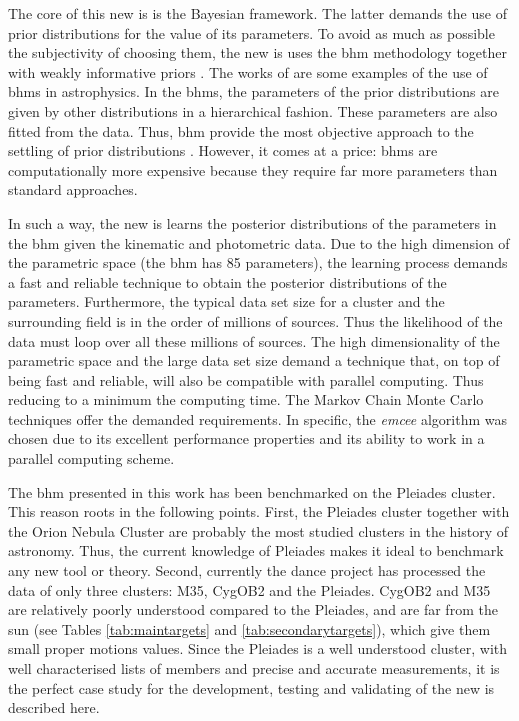 The core of this new \gls{is} is the Bayesian framework. The latter demands the use of prior distributions for the value of its parameters. To avoid as much as possible the subjectivity of choosing them, the new \gls{is} uses the \gls{bhm} methodology together with weakly informative priors  \cite[see]{Gelman2006,Gelman2008,Huang2013,Chung2015}. The works of \citet{Jefferys2007,Shkedy2007,Hogg2010,Sale2012, Feeney2013} are some examples of the use of \glspl{bhm} in astrophysics. In the \glspl{bhm}, the parameters of the prior distributions are given by other distributions in a hierarchical fashion. These parameters are also fitted from the data. Thus, \gls{bhm} provide the most objective approach to the settling of prior distributions \citep{Gelman2006}. However, it comes at a price: \glspl{bhm} are computationally more expensive because they require far more parameters than standard approaches. 

In such a way, the new \gls{is} learns the posterior distributions of the parameters in the \gls{bhm} given the kinematic and photometric data. Due to the high dimension of the parametric space (the \gls{bhm} has 85 parameters), the learning process demands a fast and reliable technique to obtain the posterior distributions of the parameters. Furthermore, the typical data set size for a cluster and the surrounding field is in the order of millions of sources. Thus the likelihood of the data must loop over all these millions of sources. The high dimensionality of the parametric space and the large data set size demand a technique that, on top of being fast and reliable, will also be compatible with parallel computing. Thus reducing to a minimum the computing time. The Markov Chain Monte Carlo techniques offer the demanded requirements. In specific, the \emph{emcee} algorithm \citep{Foreman2013} was chosen due to  its excellent performance properties and its ability to work in a parallel computing scheme.  

The \gls{bhm} presented in this work has been benchmarked on the Pleiades cluster. This reason roots in the following points. First, the Pleiades cluster together with the Orion Nebula Cluster are probably the most studied clusters in the history of astronomy. Thus, the current knowledge of Pleiades makes it ideal to benchmark any new tool or theory. Second, currently the \gls{dance} project has processed the data of only three clusters: M35, CygOB2 and the Pleiades. CygOB2 and M35 are relatively poorly understood compared to the Pleiades, and are far from the sun (see Tables \ref{tab:maintargets} and \ref{tab:secondarytargets}), which give them small proper motions values. Since the Pleiades is a well understood cluster, with well characterised lists of members \cite[e.g][]{Stauffer2007, Lodieu2012, Sarro2014, Bouy2015} and precise and accurate measurements, it is the perfect case study for the development, testing and validating of the new \gls{is} described here.

